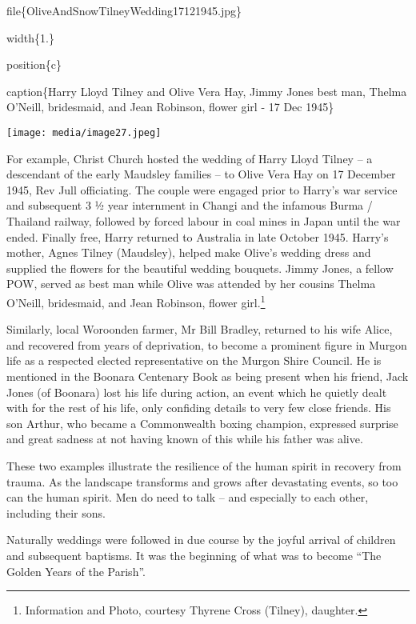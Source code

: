 file\{OliveAndSnowTilneyWedding17121945.jpg\}

width\{1.\}

position\{c\}

caption\{Harry Lloyd Tilney and Olive Vera Hay, Jimmy Jones best man, Thelma O'Neill, bridesmaid, and Jean Robinson, flower girl - 17 Dec 1945\}

\texttt{[image: media/image27.jpeg]}

For example, Christ Church hosted the wedding of Harry Lloyd Tilney -- a descendant of the early Maudsley families -- to Olive Vera Hay on 17 December 1945, Rev Jull officiating. The couple were engaged prior to Harry's war service and subsequent 3 ½ year internment in Changi and the infamous Burma / Thailand railway, followed by forced labour in coal mines in Japan until the war ended. Finally free, Harry returned to Australia in late October 1945. Harry's mother, Agnes Tilney (Maudsley), helped make Olive's wedding dress and supplied the flowers for the beautiful wedding bouquets. Jimmy Jones, a fellow POW, served as best man while Olive was attended by her cousins Thelma O'Neill, bridesmaid, and Jean Robinson, flower girl.\footnote{Information and Photo, courtesy Thyrene Cross (Tilney), daughter.}

Similarly, local Woroonden farmer, Mr Bill Bradley, returned to his wife Alice, and recovered from years of deprivation, to become a prominent figure in Murgon life as a respected elected representative on the Murgon Shire Council. He is mentioned in the Boonara Centenary Book as being present when his friend, Jack Jones (of Boonara) lost his life during action, an event which he quietly dealt with for the rest of his life, only confiding details to very few close friends. His son Arthur, who became a Commonwealth boxing champion, expressed surprise and great sadness at not having known of this while his father was alive.

These two examples illustrate the resilience of the human spirit in recovery from trauma. As the landscape transforms and grows after devastating events, so too can the human spirit. Men do need to talk -- and especially to each other, including their sons.

Naturally weddings were followed in due course by the joyful arrival of children and subsequent baptisms. It was the beginning of what was to become ``The Golden Years of the Parish''.

